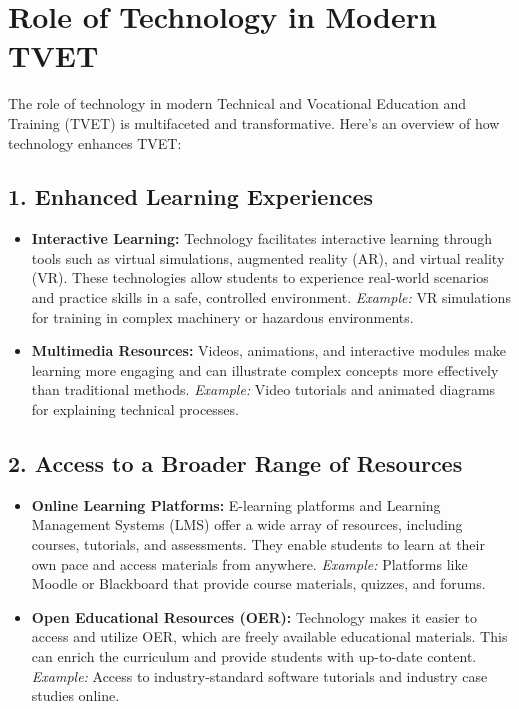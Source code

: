 \documentclass[10pt]{article}
\begin{document}
\section*{Role of Technology in Modern TVET}

The role of technology in modern Technical and Vocational Education and Training (TVET) is multifaceted and transformative. Here's an overview of how technology enhances TVET:

\subsection*{1. Enhanced Learning Experiences}
\begin{itemize}
    \item \textbf{Interactive Learning:} Technology facilitates interactive learning through tools such as virtual simulations, augmented reality (AR), and virtual reality (VR). These technologies allow students to experience real-world scenarios and practice skills in a safe, controlled environment. \textit{Example:} VR simulations for training in complex machinery or hazardous environments.
    \item \textbf{Multimedia Resources:} Videos, animations, and interactive modules make learning more engaging and can illustrate complex concepts more effectively than traditional methods. \textit{Example:} Video tutorials and animated diagrams for explaining technical processes.
\end{itemize}

\subsection*{2. Access to a Broader Range of Resources}
\begin{itemize}
    \item \textbf{Online Learning Platforms:} E-learning platforms and Learning Management Systems (LMS) offer a wide array of resources, including courses, tutorials, and assessments. They enable students to learn at their own pace and access materials from anywhere. \textit{Example:} Platforms like Moodle or Blackboard that provide course materials, quizzes, and forums.
    \item \textbf{Open Educational Resources (OER):} Technology makes it easier to access and utilize OER, which are freely available educational materials. This can enrich the curriculum and provide students with up-to-date content. \textit{Example:} Access to industry-standard software tutorials and industry case studies online.
\end{itemize}
\end{document}
